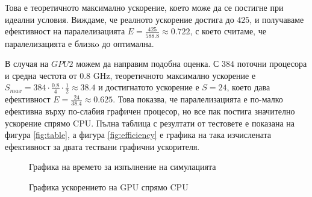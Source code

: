 \documentclass[11pt, a4paper]{article}
\begin{document}
\begin{sloppypar}
Това е теоретичното максимално ускорение, което може да се постигне при идеални условия. Виждаме, че реалното ускорение достига до $425$, и получаваме ефективност на паралелизацията $E = \frac{425}{588.8} \approx 0.722$, с което считаме, че паралелизацията е близкo до оптимална. 

В случая на $GPU2$ можем да направим подобна оценка. С $384$ поточни процесора и средна честота от $0.8$ GHz, теоретичното максимално ускорение е $S_{max} = 384 \cdot \frac{0.8}{4} \cdot \frac{1}{2} \approx 38.4 $ и достигнатото ускорение е $S = 24$, което дава ефективност $E = \frac{24}{38.4} \approx 0.625$. Това показва, че паралелизацията е по-малко ефективна върху по-слабия графичен процесор, но все пак постига значително ускорение спрямо CPU. Пълна таблица с резултати от тестовете е показана на фигура \ref{fig:table}, а фигура \ref{fig:efficiency} е графика на така изчислената ефективност за двата тествани графични ускорителя.

\begin{figure}
\caption{Графика на времето за изпълнение на симулацията}
\label{fig:time}
\centering
{}
\end{figure}

\begin{figure}
\caption{Графика ускорението на GPU спрямо CPU}
\label{fig:speedup}
\centering
{}
\end{figure}


\end{sloppypar}
\end{document}
